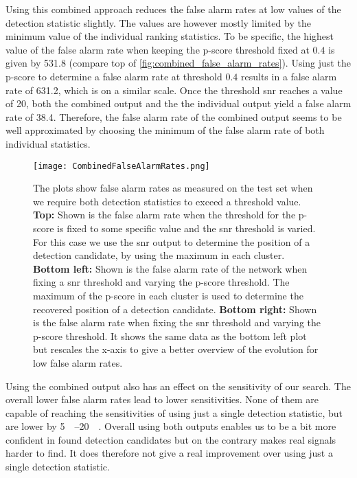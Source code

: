 Using this combined approach reduces the false alarm rates at low values of the detection statistic slightly. The values are however mostly limited by the minimum value of the individual ranking statistics. To be specific, the highest value of the false alarm rate when keeping the p-score threshold fixed at $0.4$ is given by 531.8 (compare top of \autoref{fig:combined_false_alarm_rates}). Using just the p-score to determine a false alarm rate at threshold $0.4$ results in a false alarm rate of 631.2, which is on a similar scale. Once the threshold \gls{snr} reaches a value of 20, both the combined output and the the individual output yield a false alarm rate of 38.4. Therefore, the false alarm rate of the combined output seems to be well approximated by choosing the minimum of the false alarm rate of both individual statistics.\\
\begin{figure}
\centering
\texttt{[image: CombinedFalseAlarmRates.png]}
\caption[False alarm rates of combined outputs]{The plots show false alarm rates as measured on the test set when we require both detection statistics to exceed a threshold value. \textbf{Top:} Shown is the false alarm rate when the threshold for the p-score is fixed to some specific value and the \gls{snr} threshold is varied. For this case we use the \gls{snr} output to determine the position of a detection candidate, by using the maximum in each cluster. \textbf{Bottom left:} Shown is the false alarm rate of the network when fixing a \gls{snr} threshold and varying the p-score threshold. The maximum of the p-score in each cluster is used to determine the recovered position of a detection candidate. \textbf{Bottom right:} Shown is the false alarm rate when fixing the \gls{snr} threshold and varying the p-score threshold. It shows the same data as the bottom left plot but rescales the x-axis to give a better overview of the evolution for low false alarm rates.}\label{fig:combined_false_alarm_rates}
\end{figure}
Using the combined output also has an effect on the sensitivity of our search. The overall lower false alarm rates lead to lower sensitivities. None of them are capable of reaching the sensitivities of using just a single detection statistic, but are lower by \SIrange{5}{20}{\mega\parsec}. Overall using both outputs enables us to be a bit more confident in found detection candidates but on the contrary makes real signals harder to find. It does therefore not give a real improvement over using just a single detection statistic.\medskip\\
